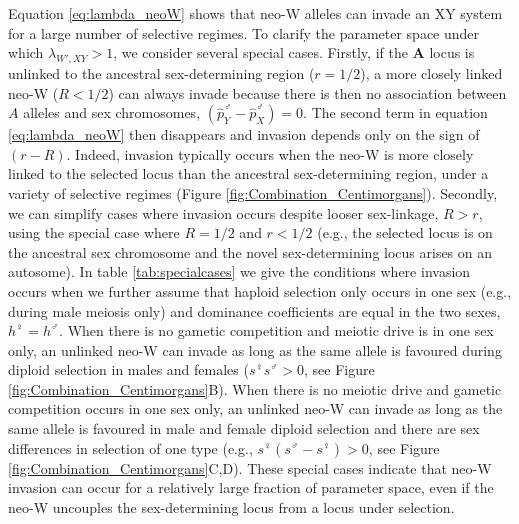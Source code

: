 \documentclass[12pt]{article}
\begin{document}
Equation \eqref{eq:lambda_neoW} shows that neo-W alleles can invade an XY system for a large number of selective regimes. 
To clarify the parameter space under which $\lambda_{W',XY}>1$, we consider several special cases. 
Firstly, if the \textbf{A} locus is unlinked to the ancestral sex-determining region ($r=1/2$), a more closely linked neo-W ($R<1/2$) can always invade because there is then no association between $A$ alleles and sex chromosomes, $\left( \hat{p}^\male_Y-\hat{p}^\male_X \right)=0$. 
The second term in equation \eqref{eq:lambda_neoW} then disappears and invasion depends only on the sign of $(r-R)$. 
Indeed, invasion typically occurs when the neo-W is more closely linked to the selected locus than the ancestral sex-determining region, under a variety of selective regimes (Figure \ref{fig:Combination_Centimorgans}).
Secondly, we can simplify cases where invasion occurs despite looser sex-linkage, $R>r$, using the special case where $R=1/2$ and $r<1/2$ (e.g., the selected locus is on the ancestral sex chromosome and the novel sex-determining locus arises on an autosome). 
In table \ref{tab:specialcases} we give the conditions where invasion occurs when we further assume that haploid selection only occurs in one sex (e.g., during male meiosis only) and dominance coefficients are equal in the two sexes, $h^\female=h^\male$. 
When there is no gametic competition and meiotic drive is in one sex only, an unlinked neo-W can invade as long as the same allele is favoured during diploid selection in males and females ($s^\female s^\male>0$, see Figure \ref{fig:Combination_Centimorgans}B). %
When there is no meiotic drive and gametic competition occurs in one sex only, an unlinked neo-W can invade as long as the same allele is favoured in male and female diploid selection and there are sex differences in selection of one type (e.g., $s^\female(s^\male-s^\female)>0$, see Figure \ref{fig:Combination_Centimorgans}C,D). %
These special cases indicate that neo-W invasion can occur for a relatively large fraction of parameter space, even if the neo-W uncouples the sex-determining locus from a locus under selection. 
\end{document}
